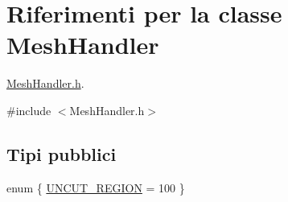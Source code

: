 \hypertarget{classMeshHandler}{\section{Riferimenti per la classe Mesh\-Handler}
\label{classMeshHandler}
}


\hyperlink{MeshHandler_8h}{Mesh\-Handler.\-h}.  




{\ttfamily \#include $<$Mesh\-Handler.\-h$>$}

\subsection*{Tipi pubblici}
\begin{DoxyCompactItemize}
\item 
enum \{ \hyperlink{classMeshHandler_a239707613811024a58eece39a4c9bab3afc8bd5152d6d9b425b5e8bf4da8bd617}{U\-N\-C\-U\-T\-\_\-\-R\-E\-G\-I\-O\-N} = 100
 \}
\end{DoxyCompactItemize}
